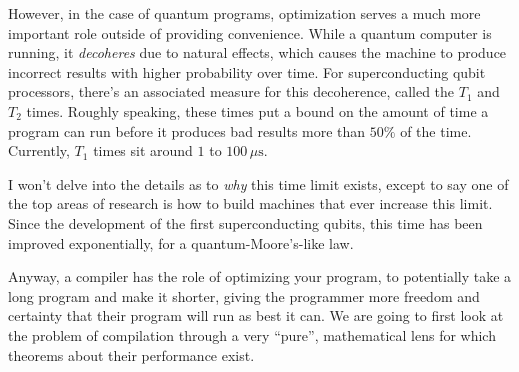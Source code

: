 However, in the case of quantum programs, optimization serves a much more important role outside of providing convenience. While a quantum computer is running, it \emph{decoheres} due to natural effects, which causes the machine to produce incorrect results with higher probability over time. For superconducting qubit processors, there's an associated measure for this decoherence, called the $T_1$ and $T_2$ times. Roughly speaking, these times put a bound on the amount of time a program can run before it produces bad results more than $50\%$ of the time. Currently, $T_1$ times sit around $1$ to $100\,\mu\mathrm{s}$.

I won't delve into the details as to \emph{why} this time limit exists, except to say one of the top areas of research is how to build machines that ever increase this limit. Since the development of the first superconducting qubits, this time has been improved exponentially, for a quantum-Moore's-like law.

Anyway, a compiler has the role of optimizing your program, to potentially take a long program and make it shorter, giving the programmer more freedom and certainty that their program will run as best it can. We are going to first look at the problem of compilation through a very ``pure'', mathematical lens for which theorems about their performance exist.

